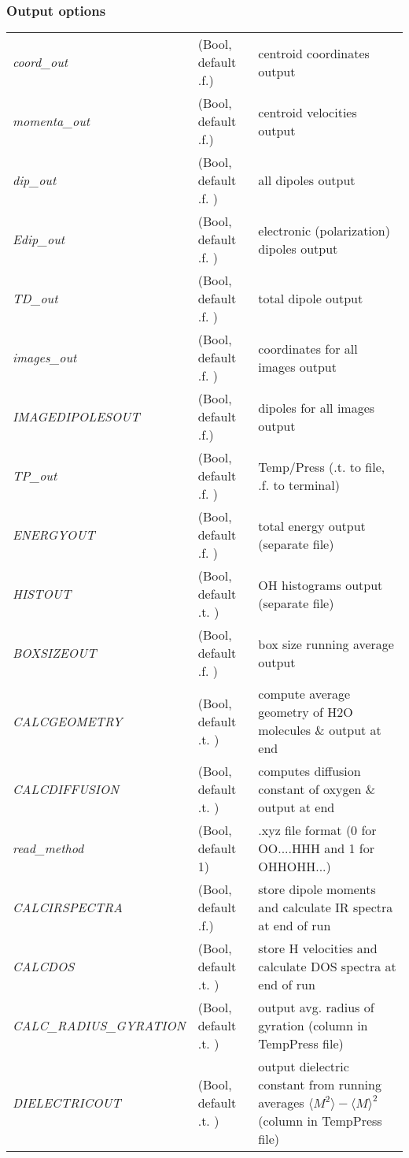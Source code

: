 \documentclass[10pt]{article}
\begin{document}
\subsubsection*{Output options}
\begin{tabular}{l l p{6cm}}
\textit{coord\_out}&(Bool, default  .f.)&        centroid coordinates output \\
\textit{momenta\_out}&(Bool, default  .f.)&       centroid velocities output \\ 
\textit{dip\_out } &(Bool, default     .f. )&      all dipoles output \\
\textit{Edip\_out } &(Bool, default    .f. )&      electronic (polarization) dipoles output\\
\textit{TD\_out  } &(Bool, default     .f. )&      total dipole output \\
\textit{images\_out} &(Bool, default  .f. )&     coordinates for all images output\\
\textit{IMAGEDIPOLESOUT }&(Bool, default  .f.)&   dipoles for all images output \\
\textit{TP\_out  }  &(Bool, default    .f.  )&     Temp/Press (.t.  to file, .f.  to terminal)\\
\textit{ENERGYOUT}  &(Bool, default     .f. )&    total energy output (separate file)\\
\textit{HISTOUT  }  &(Bool, default     .t. )&    OH histograms output (separate file) \\
\textit{BOXSIZEOUT}&(Bool, default    .f. )&      box size running average output \\
\textit{CALCGEOMETRY }&(Bool, default  .t. )& compute average geometry of H2O molecules \& output at end\\
\textit{CALCDIFFUSION}&(Bool, default  .t. )& computes diffusion constant of oxygen \& output at end\\
\textit{read\_method  }&(Bool, default  1)&   .xyz file format (0 for OO....HHH and 1 for OHHOHH...)\\
\textit{CALCIRSPECTRA} &(Bool, default  .f.)&  store dipole moments and calculate IR spectra at end of run\\
\textit{CALCDOS   } &(Bool, default  .t. )&  store H velocities and calculate DOS spectra at end of run\\
\textit{CALC\_RADIUS\_GYRATION}&(Bool, default  .t. )& output avg. radius of gyration (column in TempPress file)\\
\textit{DIELECTRICOUT}&(Bool, default  .t.  )& output dielectric constant from running averages $\langle M^2\rangle - \langle M\rangle^2$(column in TempPress file) \\

\end{tabular}
\end{document}
